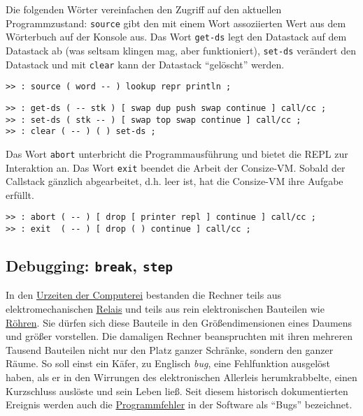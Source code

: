 Die folgenden Wörter vereinfachen den Zugriff auf den aktuellen Programmzustand: \verb|source| gibt den mit einem Wort assoziierten Wert aus dem Wörterbuch auf der Konsole aus. Das Wort \verb|get-ds| legt den Datastack auf dem Datastack ab (was seltsam klingen mag, aber funktioniert), \verb|set-ds| verändert den Datastack und mit \verb|clear| kann der Datastack "`gelöscht"' werden.

\begin{verbatim} 
>> : source ( word -- ) lookup repr println ;
\end{verbatim}

\begin{verbatim}
>> : get-ds ( -- stk ) [ swap dup push swap continue ] call/cc ;
>> : set-ds ( stk -- ) [ swap top swap continue ] call/cc ;
>> : clear ( -- ) ( ) set-ds ;
\end{verbatim}

Das Wort \verb|abort| unterbricht die Programmausführung und bietet die REPL zur Interaktion an. Das Wort \verb|exit| beendet die Arbeit der Consize-VM. Sobald der Callstack gänzlich abgearbeitet, d.h. leer ist, hat die Consize-VM ihre Aufgabe erfüllt. 

\begin{verbatim}
>> : abort ( -- ) [ drop [ printer repl ] continue ] call/cc ;
>> : exit  ( -- ) [ drop ( ) continue ] call/cc ;
\end{verbatim}

\subsection{Debugging: \texttt{break}, \texttt{step}}

In den \href{http://de.wikipedia.org/wiki/Computer#Entwicklung\_des\_modernen\_turingm.C3.A4chtigen\_Computers}{Urzeiten der Computerei} bestanden die Rechner teils aus elektromechanischen \href{http://de.wikipedia.org/wiki/Relais}{Relais} und teils aus rein elektronischen Bauteilen wie \href{http://de.wikipedia.org/wiki/Elektronenr\%C3\%B6hre}{Röhren}. Sie dürfen sich diese Bauteile in den Größendimensionen eines Daumens und größer vorstellen. Die damaligen Rechner beanspruchten mit ihren mehreren Tausend Bauteilen nicht nur den Platz ganzer Schränke, sondern den ganzer Räume. So soll einst ein Käfer, zu Englisch \emph{bug}, eine Fehlfunktion ausgelöst haben, als er in den Wirrungen des elektronischen Allerleis herumkrabbelte, einen Kurzschluss auslöste und sein Leben ließ. Seit diesem historisch dokumentierten Ereignis werden auch die \href{http://de.wikipedia.org/wiki/Programmfehler}{Programmfehler} in der Software als "`Bugs"' bezeichnet.

